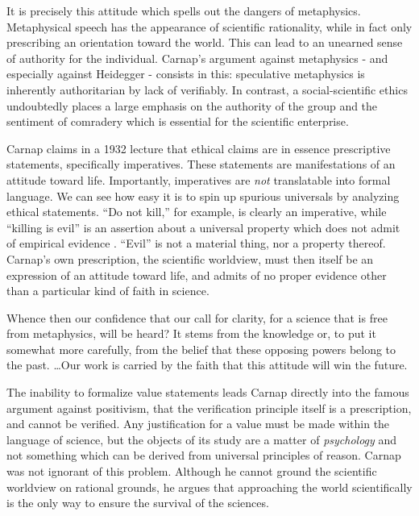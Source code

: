 \documentclass[leqno, 12pt]{turabian-researchpaper}
\begin{document}
	It is precisely this attitude which spells out the dangers of metaphysics. Metaphysical
	speech has the appearance of scientific rationality, while in fact only
	prescribing an orientation toward the world. This can lead to an unearned sense
	of authority for the individual. Carnap's argument against metaphysics - and
	especially against Heidegger - consists in this: speculative metaphysics is inherently
	authoritarian by lack of verifiably. In contrast, a social-scientific ethics undoubtedly
	places a large emphasis on the authority of the group and the sentiment of comradery
	which is essential for the scientific enterprise.

	Carnap claims in a 1932 lecture that ethical claims are in essence prescriptive
	statements, specifically imperatives. These statements are manifestations of an
	attitude toward life. Importantly, imperatives are \emph{not} translatable
	into formal language. We can see how easy it is to spin up spurious universals
	by analyzing ethical statements. \enquote{Do not kill,} for example, is
	clearly an imperative, while \enquote{killing is evil} is an assertion about a
	universal property which does not admit of empirical evidence \autocite[\S1.4]{carnap1996}.
	\enquote{Evil} is not a material thing, nor a property thereof. Carnap's own prescription,
	the scientific worldview, must then itself be an expression of an attitude toward
	life, and admits of no proper evidence other than a particular kind of faith
	in science.

	\begin{displayquote}
		 Whence then our confidence that our call for
		clarity, for a science that is free from metaphysics, will be heard? It
		stems from the knowledge or, to put it somewhat more carefully, from the
		belief that these opposing powers belong to the past. \dots Our work is carried
		by the faith that this attitude will win the future.
	\end{displayquote}

	The inability to formalize value statements leads Carnap directly into the famous
	argument against positivism, that the verification principle itself is a
	prescription, and cannot be verified. Any justification for a value must be
	made within the language of science, but the objects of its study are a matter
	of \emph{psychology} and not something which can be derived from universal
	principles of reason. Carnap was not ignorant of this problem. Although he
	cannot ground the scientific worldview on rational grounds, he argues that approaching
	the world scientifically is the only way to ensure the survival of the sciences.
\end{document}
